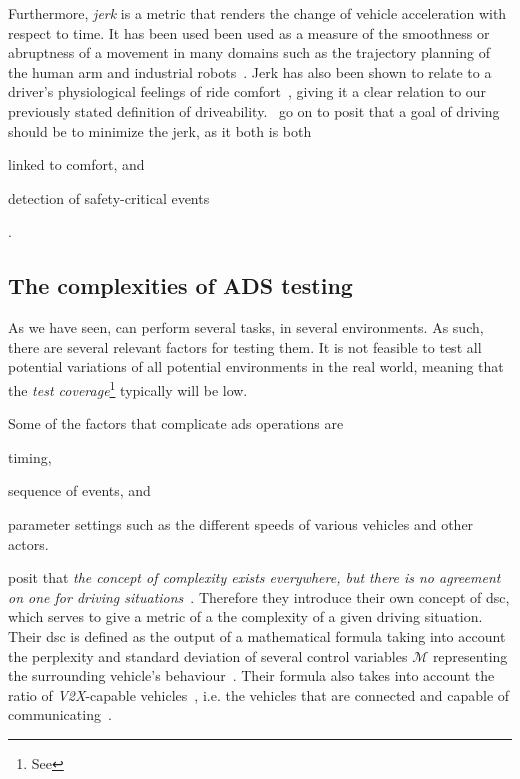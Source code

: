 Furthermore, \emph{jerk} is a metric that renders the change of vehicle acceleration with respect to
time. It has been used been used as a measure of the smoothness or abruptness of a movement in many
domains such as the trajectory planning of the human arm and industrial
robots~\cite[126]{fengJerk17}. Jerk has also been shown to relate to a driver’s
physiological feelings of ride comfort~\cite[126]{fengJerk17}, giving it a clear relation to our
previously stated definition of driveability.~\citeauthor{fengJerk17} go on to posit that a goal of
driving should be to minimize the jerk, as it both is both \begin{inparaenum}
    \item linked to comfort, and
    \item detection of safety-critical events
\end{inparaenum}\cite[126]{fengJerk17}.

\subsection{The complexities of ADS testing}\label{sec:adsTestingComplexity}

As we have seen,  can perform several tasks, in several environments. As such, there
are several relevant factors for testing them. It is not feasible to test all potential variations
of all potential environments in the real world, meaning that the \textit{test
    coverage}\footnote{See } typically will be low.

Some of the factors that complicate \acrshort{ads} operations are \begin{inparaenum}
    \item timing,
    \item sequence of events, and
    \item parameter settings such as the different speeds of various vehicles and other actors.
\end{inparaenum}

\citeauthor{adsComplexityIndex18} posit that \textit{the concept of complexity exists everywhere,
    but there is no agreement on one for driving situations}~\cite[1182]{adsComplexityIndex18}.
Therefore they introduce their own concept of \acrfull{dsc}, which serves to give a metric of a
the complexity of a given driving situation. Their \acrshort{dsc} is defined as the output of a
mathematical formula taking into account the perplexity and standard deviation of several
control variables $\mathcal{M}$ representing the surrounding vehicle's
behaviour~\cite[1182]{adsComplexityIndex18}. Their formula also takes into account the ratio of
\textit{V2X}-capable vehicles~\cite[1182]{adsComplexityIndex18}, i.e. the vehicles that are
connected and capable of communicating~\cite[1]{v2xTestingSurvey2019}.

